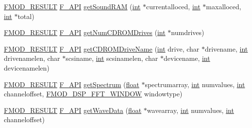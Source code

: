 \begin{DoxyCompactItemize}
\item 
\hyperlink{fmod_8h_ae6ddadf8cb315e93ae7e6456b19db276}{F\-M\-O\-D\-\_\-\-R\-E\-S\-U\-L\-T} \hyperlink{fmod_8h_ace803d13e798b0cdde4384f9f323b901}{F\-\_\-\-A\-P\-I} \hyperlink{class_f_m_o_d_1_1_system_a406c76a44c183773616569d2cdec2036}{get\-Sound\-R\-A\-M} (\hyperlink{wglew_8h_a500a82aecba06f4550f6849b8099ca21}{int} $\ast$currentalloced, \hyperlink{wglew_8h_a500a82aecba06f4550f6849b8099ca21}{int} $\ast$maxalloced, \hyperlink{wglew_8h_a500a82aecba06f4550f6849b8099ca21}{int} $\ast$total)
\item 
\hyperlink{fmod_8h_ae6ddadf8cb315e93ae7e6456b19db276}{F\-M\-O\-D\-\_\-\-R\-E\-S\-U\-L\-T} \hyperlink{fmod_8h_ace803d13e798b0cdde4384f9f323b901}{F\-\_\-\-A\-P\-I} \hyperlink{class_f_m_o_d_1_1_system_a0486b9577e9315bca170478ab27bae2f}{get\-Num\-C\-D\-R\-O\-M\-Drives} (\hyperlink{wglew_8h_a500a82aecba06f4550f6849b8099ca21}{int} $\ast$numdrives)
\item 
\hyperlink{fmod_8h_ae6ddadf8cb315e93ae7e6456b19db276}{F\-M\-O\-D\-\_\-\-R\-E\-S\-U\-L\-T} \hyperlink{fmod_8h_ace803d13e798b0cdde4384f9f323b901}{F\-\_\-\-A\-P\-I} \hyperlink{class_f_m_o_d_1_1_system_a88d949c50355f054c2363b17b8723e72}{get\-C\-D\-R\-O\-M\-Drive\-Name} (\hyperlink{wglew_8h_a500a82aecba06f4550f6849b8099ca21}{int} drive, char $\ast$drivename, \hyperlink{wglew_8h_a500a82aecba06f4550f6849b8099ca21}{int} drivenamelen, char $\ast$scsiname, \hyperlink{wglew_8h_a500a82aecba06f4550f6849b8099ca21}{int} scsinamelen, char $\ast$devicename, \hyperlink{wglew_8h_a500a82aecba06f4550f6849b8099ca21}{int} devicenamelen)
\item 
\hyperlink{fmod_8h_ae6ddadf8cb315e93ae7e6456b19db276}{F\-M\-O\-D\-\_\-\-R\-E\-S\-U\-L\-T} \hyperlink{fmod_8h_ace803d13e798b0cdde4384f9f323b901}{F\-\_\-\-A\-P\-I} \hyperlink{class_f_m_o_d_1_1_system_a6ce8950d031e5c213d85e9c9b04bc201}{get\-Spectrum} (\hyperlink{fmod_8h_aeb841aa4b4b5f444b5d739d865b420af}{float} $\ast$spectrumarray, \hyperlink{wglew_8h_a500a82aecba06f4550f6849b8099ca21}{int} numvalues, \hyperlink{wglew_8h_a500a82aecba06f4550f6849b8099ca21}{int} channeloffset, \hyperlink{fmod_8h_a367a057220514092d4e981e8c45a998b}{F\-M\-O\-D\-\_\-\-D\-S\-P\-\_\-\-F\-F\-T\-\_\-\-W\-I\-N\-D\-O\-W} windowtype)
\item 
\hyperlink{fmod_8h_ae6ddadf8cb315e93ae7e6456b19db276}{F\-M\-O\-D\-\_\-\-R\-E\-S\-U\-L\-T} \hyperlink{fmod_8h_ace803d13e798b0cdde4384f9f323b901}{F\-\_\-\-A\-P\-I} \hyperlink{class_f_m_o_d_1_1_system_a5a28459b7c9b3d5023001ec5c96b2bf9}{get\-Wave\-Data} (\hyperlink{fmod_8h_aeb841aa4b4b5f444b5d739d865b420af}{float} $\ast$wavearray, \hyperlink{wglew_8h_a500a82aecba06f4550f6849b8099ca21}{int} numvalues, \hyperlink{wglew_8h_a500a82aecba06f4550f6849b8099ca21}{int} channeloffset)

\end{DoxyCompactItemize}
